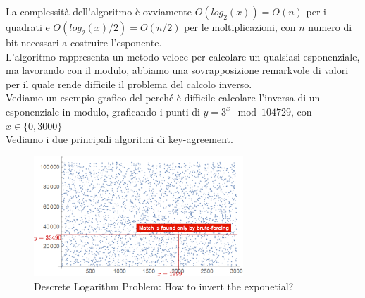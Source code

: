 La complessità dell'algoritmo è ovviamente $O(log_2(x))=O(n)$ per i quadrati e $O(log_2(x)/2)=O(n/2)$ per le moltiplicazioni, con $n$ numero di bit necessari a costruire l'esponente.\\
L'algoritmo rappresenta un metodo veloce per calcolare un qualsiasi esponenziale, ma lavorando con il modulo, abbiamo una sovrapposizione remarkvole di valori per il quale rende difficile il problema del calcolo inverso.\\
Vediamo un esempio grafico del perché è difficile calcolare l'inversa di un esponenziale in modulo, graficando i punti di $y=3^x\mod104729$, con $x\in\{0,3000\}$\\
Vediamo i due principali algoritmi di key-agreement.
\begin{figure}[ht]
    \centering
    \includegraphics[width=0.7\textwidth]{image/descretelog.png}
    \caption{Descrete Logarithm Problem: How to invert the exponetial?}
    \label{fig:descretelog}
\end{figure}
